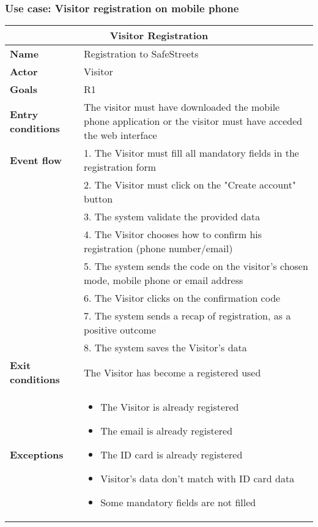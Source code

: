 \subsubsection{Use case: Visitor registration on mobile phone}
\begin{center}
    \begin{tabular}{|p{3cm}|p{7cm}|}
        \multicolumn{2}{c}{\textbf{Visitor Registration}} \\
        \hline
        \textbf{Name} & Registration to SafeStreets \\
        \hline
        \textbf{Actor} & Visitor \\
        \hline
        \textbf{Goals} & R1 \\
        \hline
        \textbf{Entry conditions} & The visitor must have downloaded the mobile phone application or the visitor must have acceded the web interface \\
        \hline
        \textbf{Event flow} & 1. The Visitor must fill all mandatory fields in the registration form \\ 
        & 2. The Visitor must click on the "Create account" button \\ 
        & 3. The system validate the provided data \\
        & 4. The Visitor chooses how to confirm his registration (phone number/email) \\
        & 5. The system sends the code on the visitor's chosen mode, mobile phone or email address \\ 
        & 6. The Visitor clicks on the confirmation code \\ 
        & 7. The system sends a recap of registration, as a positive outcome \\
        & 8. The system saves the Visitor's data \\
        \hline
        \textbf{Exit conditions} & The Visitor has become a registered used \\
        \hline
        \textbf{Exceptions}
        & \begin{itemize}
            \item The Visitor is already registered
            \item The email is already registered
            \item The ID card is already registered 
            \item Visitor's data don't match with ID card data
            \item Some mandatory fields are not filled 
        \end{itemize} \\
        \hline
    \end{tabular}
\end{center}


